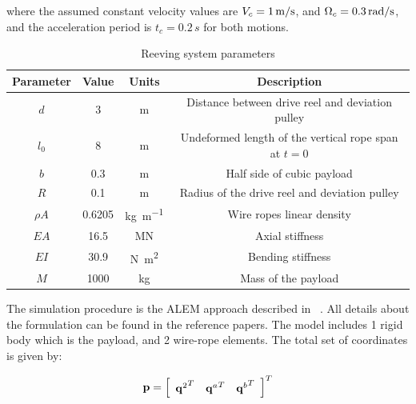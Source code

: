 \setlength{\parindent}{0cm}
where the assumed constant velocity values are $V_c = 1\, {\rm{m}}/{{\rm{s}}}$, and $\Omega_c = 0.3\, {\rm{rad}}/{{\rm{s}}}$, and the acceleration period is $t_c = 0.2 \,s$ for both motions.

\begin{table}[tbph]
    \caption{Reeving system parameters} \label{tab:reeving_system_parameters}
    \centering
    \begin{tabular}{c|c|c|c} \hline
        Parameter & Value & Units & Description \\ \hline
        $d$ & 
            3 & \si{\meter} & 
            Distance between drive reel and deviation pulley \\
        $l_0$ & 
            8 & \si{\meter} & 
            Undeformed length of the vertical rope span at $t = 0$ \\
        $b$ & 
            0.3 & \si{\meter} & 
            Half side of cubic payload \\
        $R$ & 
            \num{0.1} & \si{\meter} & 
            Radius of the drive reel and deviation pulley \\
        $\rho A$ & 
            \num{0.6205} & \si{\kilo\gram\per\meter} & 
            Wire ropes linear density \\
        $EA$ & 
            \num{16.5} & \si{\mega\newton} & 
            Axial stiffness \\
        $EI$ & 
            \num{30.9} & \si{\newton\meter\squared} & 
            Bending stiffness \\
        $M$ & 
            1000 & \si{\kilo\gram} & 
            Mass of the payload \\ \hline
    \end{tabular}
\end{table}

The simulation procedure is the ALEM approach described in ~\cite{Escalona2017, EscalonaOrzechowskiMikkola2018, Escalona2022}. All details about the formulation can be found in the reference papers. The model includes 1 rigid body which is the payload, and 2 wire-rope elements. The total set of coordinates is given by:

\begin{equation}
    {{\bf{p}}} = {\left[ {\begin{array}{*{20}{c}}{{\bf{q}}^{2}}^T & {{\bf{q}}^{a}}^T & {{\bf{q}}^{b}}^T \end{array}} \right]^T}
    \label{CoordinateS2}
\end{equation}

